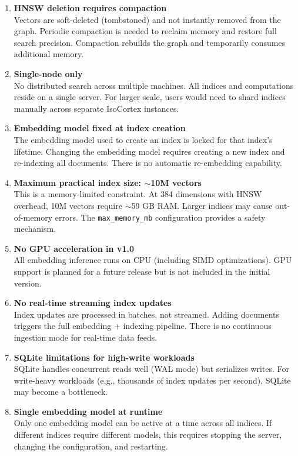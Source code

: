 \documentclass[11pt,a4paper]{article}
\newcommand{\inlinecode}[1]{\texttt{\small\colorbox{ctCodeBg}{#1}}}
\begin{document}
\begin{warningbox}
\begin{enumerate}
    \item \textbf{HNSW deletion requires compaction} \\
    Vectors are soft-deleted (tombstoned) and not instantly removed from the graph. Periodic compaction is needed to reclaim memory and restore full search precision. Compaction rebuilds the graph and temporarily consumes additional memory.

    \item \textbf{Single-node only} \\
    No distributed search across multiple machines. All indices and computations reside on a single server. For larger scale, users would need to shard indices manually across separate IsoCortex instances.

    \item \textbf{Embedding model fixed at index creation} \\
    The embedding model used to create an index is locked for that index's lifetime. Changing the embedding model requires creating a new index and re-indexing all documents. There is no automatic re-embedding capability.

    \item \textbf{Maximum practical index size: $\sim$10M vectors} \\
    This is a memory-limited constraint. At 384 dimensions with HNSW overhead, 10M vectors require $\sim$59 GB RAM. Larger indices may cause out-of-memory errors. The \inlinecode{max\_memory\_mb} configuration provides a safety mechanism.

    \item \textbf{No GPU acceleration in v1.0} \\
    All embedding inference runs on CPU (including SIMD optimizations). GPU support is planned for a future release but is not included in the initial version.

    \item \textbf{No real-time streaming index updates} \\
    Index updates are processed in batches, not streamed. Adding documents triggers the full embedding + indexing pipeline. There is no continuous ingestion mode for real-time data feeds.

    \item \textbf{SQLite limitations for high-write workloads} \\
    SQLite handles concurrent reads well (WAL mode) but serializes writes. For write-heavy workloads (e.g., thousands of index updates per second), SQLite may become a bottleneck.

    \item \textbf{Single embedding model at runtime} \\
    Only one embedding model can be active at a time across all indices. If different indices require different models, this requires stopping the server, changing the configuration, and restarting.
\end{enumerate}
\end{warningbox}
\end{document}
